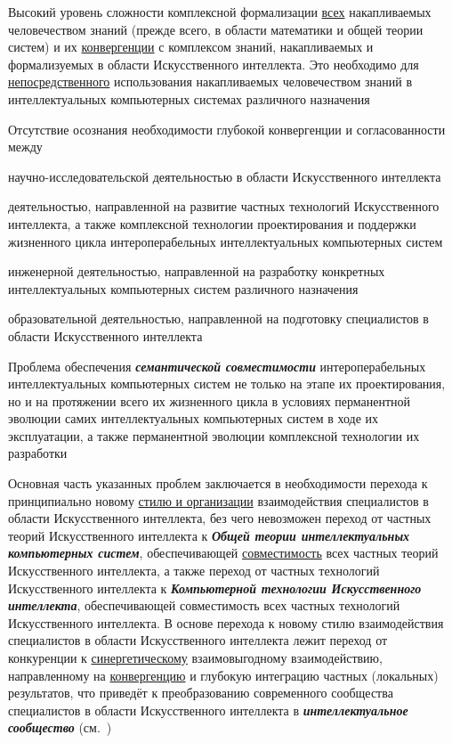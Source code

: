 \begin{textitemize}
	\item 
	Высокий уровень сложности комплексной формализации \uline{всех} накапливаемых человечеством знаний (прежде всего, в области математики и общей теории систем) и их \uline{конвергенции} с комплексом знаний, накапливаемых и формализуемых в области Искусственного интеллекта. Это необходимо для \uline{непосредственного} использования накапливаемых человечеством знаний в интеллектуальных компьютерных системах различного назначения
	\item 
	Отсутствие осознания необходимости глубокой конвергенции и согласованности между
	\begin{textitemize}
		\item научно-исследовательской деятельностью в области Искусственного интеллекта
		\item деятельностью, направленной на развитие частных технологий Искусственного интеллекта, а также комплексной технологии проектирования и поддержки жизненного цикла интероперабельных интеллектуальных компьютерных систем
		\item инженерной деятельностью, направленной на разработку конкретных интеллектуальных компьютерных систем различного назначения
		\item образовательной деятельностью, направленной на подготовку специалистов в области Искусственного интеллекта
	\end{textitemize}
	\item 
	Проблема обеспечения \textbf{\textit{семантической совместимости}} интероперабельных интеллектуальных компьютерных систем не только на этапе их проектирования, но и на протяжении всего их жизненного цикла в условиях перманентной эволюции самих интеллектуальных компьютерных систем в ходе их эксплуатации, а также перманентной эволюции комплексной технологии их разработки
\end{textitemize}

Основная часть указанных проблем заключается в необходимости перехода к принципиально новому \uline{стилю и организации} взаимодействия специалистов в области Искусственного интеллекта, без чего невозможен переход от частных теорий Искусственного интеллекта к \textbf{\textit{Общей теории интеллектуальных компьютерных систем}}, обеспечивающей \uline{совместимость} всех частных теорий Искусственного интеллекта, а также переход от частных технологий Искусственного интеллекта к \textbf{\textit{Компьютерной технологии Искусственного интеллекта}}, обеспечивающей совместимость всех частных технологий Искусственного интеллекта. В основе перехода к новому стилю взаимодействия специалистов в области Искусственного интеллекта лежит переход от конкуренции к \uline{синергетическому} взаимовыгодному взаимодействию, направленному на \uline{конвергенцию} и глубокую интеграцию частных (локальных) результатов, что приведёт к преобразованию современного сообщества специалистов в области Искусственного интеллекта в \textbf{\textit{интеллектуальное сообщество}} (см.~\cite{Tarasov2002})

